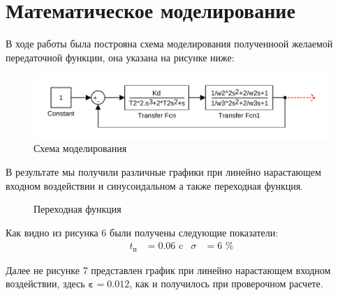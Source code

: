 \documentclass[russian, utf8]{eskdtext}
\begin{document}
\newpage
\section{Математическое моделирование}

В ходе работы была построяна схема моделирования полученноой желаемой передаточной функции, она указана на рисунке ниже: 
\begin{figure}[h!]
    \centering
    \includegraphics {images/model.pdf} 
    \caption{Схема моделирования}
\end{figure} \par

В результате мы получили различные графики при линейно нарастающем входном воздействии и синусоидальном а также переходная функция.
\begin{figure}[h!]
    \centering
    \caption{Переходная функция}
\end{figure} \par
Как видно из рисунка 6 были получены следующие показатели:
\begin{align*}
    t_\text{п} & = 0.06\text{ c} & \sigma & = 6\text{ \%}
\end{align*} \par

\newpage
Далее не рисунке 7 представлен график при линейно нарастающем входном воздействии, здесь $\pmb{\varepsilon} = 0.012$, как и получилось при проверочном расчете.
\end{document}
